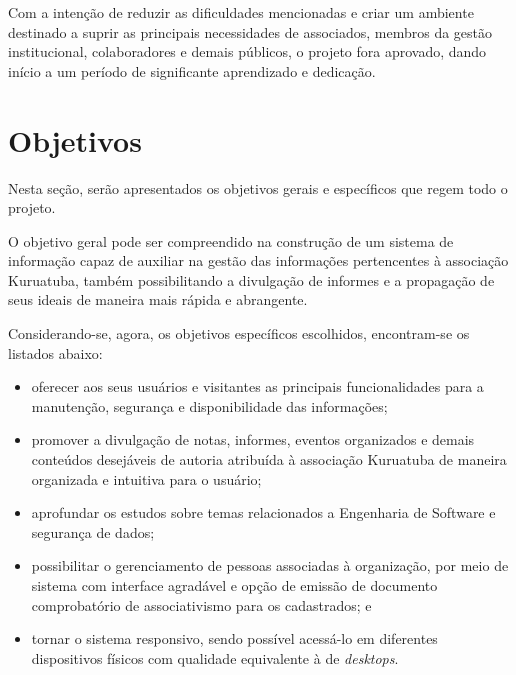 Com a intenção de reduzir as dificuldades mencionadas e criar um ambiente destinado a suprir as principais necessidades de associados, membros da gestão institucional, colaboradores e demais públicos, o projeto fora aprovado, dando início a um período de significante aprendizado e dedicação.

\hspace{2.5cm}
\section{Objetivos}
\label{sec:telas}
\hspace{2.5cm}

Nesta seção, serão apresentados os objetivos gerais e específicos que regem todo o projeto. 

O objetivo geral pode ser compreendido na construção de um sistema de informação capaz de auxiliar na gestão das informações pertencentes à associação Kuruatuba, também possibilitando a divulgação de informes e a propagação de seus ideais de maneira mais rápida e abrangente.

Considerando-se, agora, os objetivos específicos escolhidos, encontram-se os listados abaixo:  
\begin{itemize}
 \item oferecer aos seus usuários e visitantes as principais funcionalidades para a manutenção, segurança e disponibilidade das informações;
 
 \item promover a divulgação de notas, informes, eventos organizados e demais conteúdos desejáveis de autoria atribuída à associação Kuruatuba de maneira organizada e intuitiva para o usuário;
 
 \item aprofundar os estudos sobre temas relacionados a Engenharia de Software e segurança de dados;
 
 \item possibilitar o gerenciamento de pessoas associadas à organização, por meio de sistema com interface agradável e opção de emissão de documento comprobatório de associativismo para os cadastrados; e
 
 \item tornar o sistema responsivo, sendo possível acessá-lo em diferentes dispositivos físicos com qualidade equivalente à de \textit{desktops}.  
\end{itemize}



